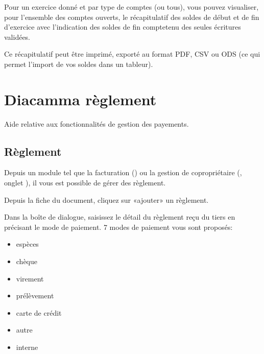 \documentclass[a4paper,10pt,oneside,french]{sphinxmanual}
\begin{document}
\sphinxAtStartPar
Pour un exercice donné et par type de comptes (ou tous), vous pouvez visualiser, pour l’ensemble des comptes ouverts, le récapitulatif des soldes de début et de fin d’exercice avec l’indication des soldes de fin compte\sphinxhyphen{}tenu des seules écritures validées.

\sphinxAtStartPar
Ce récapitulatif peut être imprimé, exporté au format PDF, CSV ou ODS (ce qui permet l’import de vos soldes dans un tableur).

\sphinxstepscope


\chapter{Diacamma règlement}
\label{\detokenize{payoff/index:diacamma-reglement}}\label{\detokenize{payoff/index::doc}}
\sphinxAtStartPar
Aide relative aux fonctionnalités de gestion des payements.

\sphinxstepscope


\section{Règlement}
\label{\detokenize{payoff/payoff:reglement}}\label{\detokenize{payoff/payoff::doc}}
\sphinxAtStartPar
Depuis un module tel que la facturation () ou la gestion de copropriétaire (, onglet ), il vous est possible de gérer des règlement.

\sphinxAtStartPar
Depuis la fiche du document, cliquez sur «ajouter» un règlement.
\begin{quote}

\noindent{}
\end{quote}

\sphinxAtStartPar
Dans la boîte de dialogue, saisissez le détail du règlement reçu du tiers en précisant le mode de paiement.
7 modes de paiement vous sont proposés:
\begin{itemize}
\item {} 
\sphinxAtStartPar
espèces

\item {} 
\sphinxAtStartPar
chèque

\item {} 
\sphinxAtStartPar
virement

\item {} 
\sphinxAtStartPar
prélèvement

\item {} 
\sphinxAtStartPar
carte de crédit

\item {} 
\sphinxAtStartPar
autre

\item {} 
\sphinxAtStartPar
interne

\end{itemize}
\end{document}
